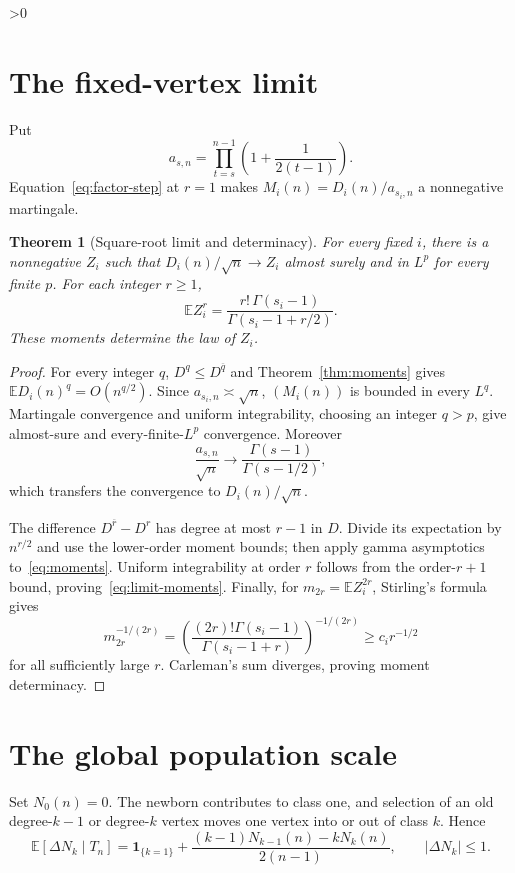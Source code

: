 \documentclass[9pt]{extarticle}
\newtheorem{theorem}{Theorem}
\newcommand{\E}{\mathbb E}
\newcommand{\1}{\mathbf 1}
\begin{document}
\ifnum\CRevisionRound>0
\section{The fixed-vertex limit}
Put
\[
 a_{s,n}=\prod_{t=s}^{n-1}\left(1+\frac1{2(t-1)}\right).
\]
Equation~\eqref{eq:factor-step} at $r=1$ makes
$M_i(n)=D_i(n)/a_{s_i,n}$ a nonnegative martingale.

\begin{theorem}[Square-root limit and determinacy]\label{thm:local-limit}
For every fixed $i$, there is a nonnegative $Z_i$ such that
$D_i(n)/\sqrt n\to Z_i$ almost surely and in $L^p$ for every finite $p$.
For each integer $r\geq1$,
\begin{equation}\label{eq:limit-moments}
 \E Z_i^r=\frac{r!\,\Gamma(s_i-1)}{\Gamma(s_i-1+r/2)}.
\end{equation}
These moments determine the law of $Z_i$.
\end{theorem}
\begin{proof}
For every integer $q$, $D^q\leq D^{\overline q}$ and
Theorem~\ref{thm:moments} gives $\E D_i(n)^q=O(n^{q/2})$.  Since
$a_{s_i,n}\asymp\sqrt n$, $(M_i(n))$ is bounded in every $L^q$.
Martingale convergence and uniform integrability, choosing an integer $q>p$,
give almost-sure and every-finite-$L^p$ convergence.  Moreover
\[
 \frac{a_{s,n}}{\sqrt n}\longrightarrow
 \frac{\Gamma(s-1)}{\Gamma(s-1/2)},
\]
which transfers the convergence to $D_i(n)/\sqrt n$.

The difference $D^{\overline r}-D^r$ has degree at most $r-1$ in $D$.
Divide its expectation by $n^{r/2}$ and use the lower-order moment bounds;
then apply gamma asymptotics to~\eqref{eq:moments}.  Uniform integrability at
order $r$ follows from the order-$r+1$ bound, proving~\eqref{eq:limit-moments}.
Finally, for $m_{2r}=\E Z_i^{2r}$, Stirling's formula gives
\[
 m_{2r}^{-1/(2r)}=
 \left(\frac{(2r)!\Gamma(s_i-1)}{\Gamma(s_i-1+r)}\right)^{-1/(2r)}
 \geq c_i r^{-1/2}
\]
for all sufficiently large $r$.  Carleman's sum diverges, proving moment
determinacy.
\end{proof}

\section{The global population scale}
Set $N_0(n)=0$.  The newborn contributes to class one, and selection of an
old degree-$k-1$ or degree-$k$ vertex moves one vertex into or out of class
$k$.  Hence
\begin{equation}\label{eq:drift}
 \E[\Delta N_k\mid T_n]=\1_{\{k=1\}}+
 \frac{(k-1)N_{k-1}(n)-kN_k(n)}{2(n-1)},\qquad |\Delta N_k|\leq1.
\end{equation}
\end{document}
